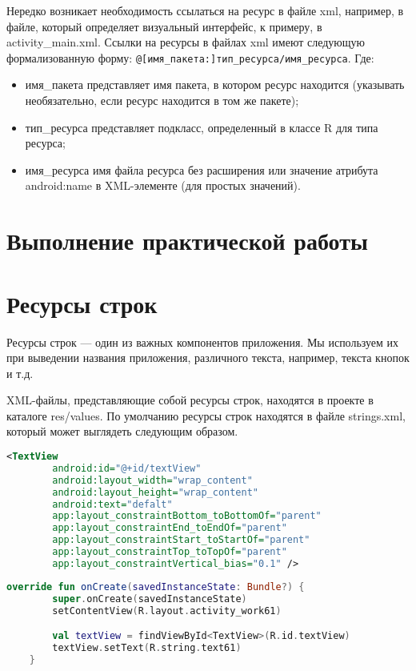 Нередко возникает необходимость ссылаться на ресурс в файле xml,
например, в файле, который определяет визуальный интерфейс, к примеру, в
activity\_main.xml. Ссылки на ресурсы в файлах xml имеют следующую
формализованную форму: \verb|@[имя_пакета:]тип_ресурса/имя_ресурса|. Где:
\begin{itemize}
	\item имя\_пакета представляет имя пакета, в котором ресурс находится
		(указывать необязательно, если ресурс находится в том же пакете);
	\item тип\_ресурса представляет подкласс, определенный в классе R для
		типа ресурса;
	\item имя\_ресурса имя файла ресурса без расширения или значение
		атрибута android:name в XML-элементе (для простых значений).
\end{itemize}

\clearpage

\section*{\LARGE{Выполнение практической работы}}

\section{Ресурсы строк}
Ресурсы строк --- один из важных компонентов приложения. Мы используем
их при выведении названия приложения, различного текста, например, текста
кнопок и т.д.\par
XML-файлы, представляющие собой ресурсы строк, находятся в проекте в
каталоге res/values. По умолчанию ресурсы строк находятся в файле strings.xml,
который может выглядеть следующим образом.\par
\begin{lstlisting}[language=xml, caption=\leftline{Использование ресурсов строк в XML-коде}, label=lst:xml:string]
<TextView
        android:id="@+id/textView"
        android:layout_width="wrap_content"
        android:layout_height="wrap_content"
        android:text="defalt"
        app:layout_constraintBottom_toBottomOf="parent"
        app:layout_constraintEnd_toEndOf="parent"
        app:layout_constraintStart_toStartOf="parent"
        app:layout_constraintTop_toTopOf="parent"
        app:layout_constraintVertical_bias="0.1" />
\end{lstlisting}

\begin{lstlisting}[language=Kotlin, caption=\leftline{Использование ресурсов строк в коде}, label=lst:string]
override fun onCreate(savedInstanceState: Bundle?) {
        super.onCreate(savedInstanceState)
        setContentView(R.layout.activity_work61)

        val textView = findViewById<TextView>(R.id.textView)
        textView.setText(R.string.text61)
    }
\end{lstlisting}


